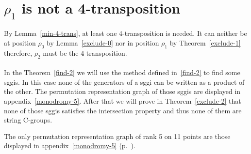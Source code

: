 \section{$\rho_1$ is not a 4-transposition}

\paragraph{}
By Lemma~\ref{min-4-trans}, at least one 4-transposition is needed. It can neither be at position $\rho_0$ by Lemma~\ref{exclude-0} nor in position $\rho_1$ by Theorem~\ref{exclude-1} therefore, $\rho_2$ must be the 4-transposition.

\paragraph{}
In the Theorem~\ref{find-2} we will use the method defined in~\ref{find-2} to find some sggis. In this case none of the generators of a sggi can be written as a product of the other. The permutation representation graph of those sggis are displayed in appendix~\ref{monodromy-5}. After that we will prove in Theorem~\ref{exclude-2} that none of those sggis satisfies the intersection property and thus none of them are string C-groups.

\begin{theorem}
  \label{find-2}
  The only permutation representation graph of rank 5 on 11 points are those displayed in appendix~\ref{monodromy-5} (p.~\pageref{monodromy-5}).
\end{theorem}

